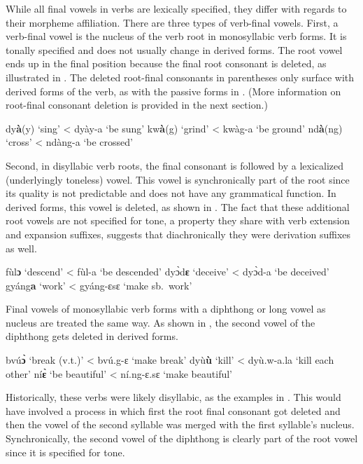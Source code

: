 While all final vowels in verbs are lexically specified, they differ with regards to their morpheme affiliation. There are three types of verb-final vowels. First, a verb-final vowel is the nucleus of the verb root in monosyllabic verb forms. It is tonally specified and does not usually change in derived forms. The root vowel ends up in the final position because the final root consonant is deleted, as illustrated in . The deleted root-final consonants in parentheses only surface with derived forms of the verb, as with the passive forms in . (More information on root-final consonant deletion is provided in the next section.)

\ea \label{Vroot5}
  \ea  dy{\bfseries à}(y) `sing' < dyày-a `be sung'
\ex kw{\bfseries à}(g) `grind' < kwàg-a `be ground'
\ex nd{\bfseries à}(ng) `cross' < ndàng-a `be crossed'
\z
\z

\largerpage
Second, in disyllabic verb roots, the final consonant is followed by a lexicalized (underlyingly toneless) vowel. This vowel is synchronically part of the root since its quality is not predictable and does not have any grammatical function. In derived forms, this vowel is deleted, as shown in . The fact that these additional root vowels are not specified for tone, a property they share with verb extension and expansion suffixes, suggests that diachronically they were derivation suffixes as well.

\ea \label{Vroot6a}
  \ea  fùl{\bfseries ɔ} `descend' < fùl-a `be descended'
\ex dyɔ̀d{\bfseries ɛ} `deceive' < dyɔ̀d-a `be deceived'
\ex gyáng{\bfseries a} `work' < gyáng-ɛsɛ `make sb.\ work'
\z
\z

\noindent Final vowels of monosyllabic verb forms with a diphthong or long vowel as nucleus are treated the same way. As shown in , the second vowel of the diphthong gets deleted in derived forms.

\ea \label{Vroot6b}
  \ea  bvú{\bfseries ɔ̀} `break (v.t.)' < bvú.g-ɛ `make break'
\ex dyù{\bfseries ù} `kill' < dyù.w-a.la `kill each other'
\ex ní{\bfseries ɛ̀} `be beautiful' < ní.ng-ɛ.sɛ `make beautiful'
\z
\z

\noindent Historically, these verbs were likely disyllabic, as the examples in . This would have involved a process in which first the root final consonant got deleted and then the vowel of the second syllable was merged with the first syllable's nucleus. Synchronically, the second vowel of the diphthong is clearly part of the root vowel since it is specified for tone.

